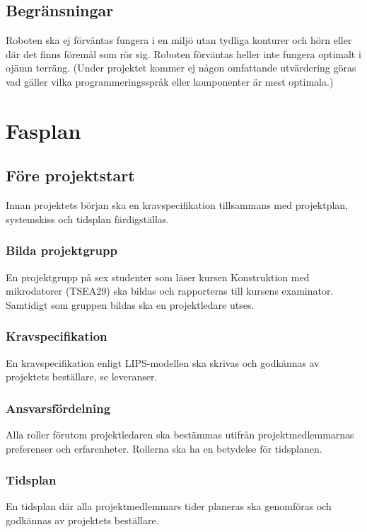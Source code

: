 \documentclass{article}
\begin{document}
\subsection{Begränsningar}
Roboten ska ej förväntas fungera i en miljö utan tydliga konturer och hörn eller där det finns föremål som rör sig. Roboten förväntas heller inte fungera optimalt i ojämn terräng. (Under projektet kommer ej någon omfattande utvärdering göras vad gäller vilka programmeringsspråk eller komponenter är mest optimala.)

\section{Fasplan}

\subsection{Före projektstart}
Innan projektets början ska en kravspecifikation tillsammans med projektplan, systemskiss och tidsplan färdigställas.

\subsubsection{Bilda projektgrupp}
En projektgrupp på sex studenter som läser kursen Konstruktion med mikrodatorer (TSEA29) ska bildas och rapporteras till kursens examinator. Samtidigt som gruppen bildas ska en projektledare utses.
   
\subsubsection{Kravspecifikation}
En kravspecifikation enligt LIPS-modellen ska skrivas och godkännas av projektets beställare, se leveranser.

\subsubsection{Ansvarsfördelning}
Alla roller förutom projektledaren ska bestämmas utifrån projektmedlemmarnas preferenser och erfarenheter. Rollerna ska ha en betydelse för tidsplanen.

\subsubsection{Tidsplan}
En tidsplan där alla projektmedlemmars tider planeras ska genomföras och godkännas av projektets beställare.
\end{document}
